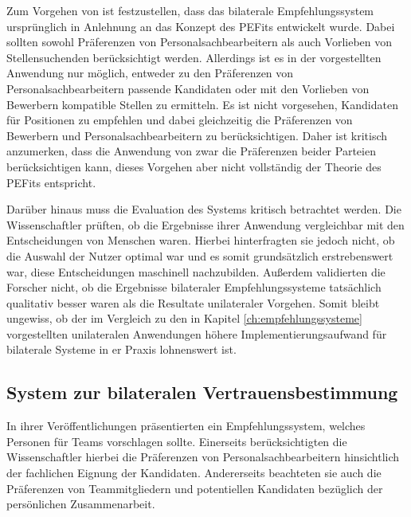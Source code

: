 Zum Vorgehen von \textcite[S. 3ff.]{malinowski:2006} ist festzustellen, dass das bilaterale Empfehlungssystem ursprünglich in Anlehnung an das Konzept des \acp{PEFit} entwickelt wurde. Dabei sollten sowohl Präferenzen von Personalsachbearbeitern als auch Vorlieben von Stellensuchenden berücksichtigt werden. Allerdings ist es in der vorgestellten Anwendung nur möglich, entweder zu den Präferenzen von Personalsachbearbeitern passende Kandidaten oder mit den Vorlieben von Bewerbern kompatible Stellen zu ermitteln. Es ist nicht vorgesehen, Kandidaten für Positionen zu empfehlen und dabei gleichzeitig die Präferenzen von Bewerbern und Personalsachbearbeitern zu berücksichtigen. Daher ist kritisch anzumerken, dass die Anwendung von \textcite[S. 3ff.]{malinowski:2006} zwar die Präferenzen beider Parteien berücksichtigen kann, dieses Vorgehen aber nicht vollständig der Theorie des \acp{PEFit} entspricht.

Darüber hinaus muss die Evaluation des Systems kritisch betrachtet werden. Die Wissenschaftler prüften, ob die Ergebnisse ihrer Anwendung vergleichbar mit den Entscheidungen von Menschen waren. Hierbei hinterfragten sie jedoch nicht, ob die Auswahl der Nutzer optimal war und es somit grundsätzlich erstrebenswert war, diese Entscheidungen maschinell nachzubilden. Außerdem validierten die Forscher nicht, ob die Ergebnisse bilateraler Empfehlungssysteme tatsächlich qualitativ besser waren als die Resultate unilateraler Vorgehen. Somit bleibt ungewiss, ob der im Vergleich zu den in Kapitel \ref{ch:empfehlungssysteme} vorgestellten unilateralen Anwendungen höhere Implementierungsaufwand für bilaterale Systeme in er Praxis lohnenswert ist.

\subsection{System zur bilateralen Vertrauensbestimmung}
\label{ch:verwandteArbeiten:aufDemPEFitBasierendeBilateraleSysteme:bilateraleVertrauensbestimmung}
In ihrer Veröffentlichungen präsentierten \textcite[S. 1]{malinowski:2005} ein Empfehlungssystem, welches Personen für Teams vorschlagen sollte. Einerseits berücksichtigten die Wissenschaftler hierbei die Präferenzen von Personalsachbearbeitern hinsichtlich der fachlichen Eignung der Kandidaten. Andererseits beachteten sie auch die Präferenzen von Teammitgliedern und potentiellen Kandidaten bezüglich der persönlichen Zusammenarbeit.

